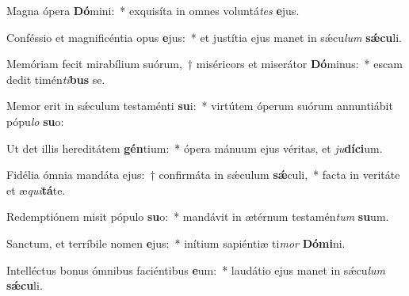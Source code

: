 \item Magna ópera \textbf{Dó}mini:~* exquisíta in omnes voluntá\textit{tes} \textbf{e}jus.
\item Conféssio et magnificéntia opus \textbf{e}jus:~* et justítia ejus manet in sǽcu\textit{lum} \textbf{sǽ}\textbf{cu}li.
\item Memóriam fecit mirabílium suórum,~† miséricors et miserátor \textbf{Dó}minus:~* escam dedit timén\textit{ti}\textbf{bus} se.
\item Memor erit in sǽculum testaménti \textbf{su}i:~* virtútem óperum suórum annuntiábit pópu\textit{lo} \textbf{su}o:
\item Ut det illis hereditátem \textbf{gén}tium:~* ópera mánuum ejus véritas, et \textit{ju}\textbf{dí}\textbf{ci}um.
\item Fidélia ómnia mandáta ejus:~† confirmáta in sǽculum \textbf{sǽ}culi,~* facta in veritáte et æ\textit{qui}\textbf{tá}te.
\item Redemptiónem misit pópulo \textbf{su}o:~* mandávit in ætérnum testamén\textit{tum} \textbf{su}um.
\item Sanctum, et terríbile nomen \textbf{e}jus:~* inítium sapiéntiæ ti\textit{mor} \textbf{Dó}\textbf{mi}ni.
\item Intelléctus bonus ómnibus faciéntibus \textbf{e}um:~* laudátio ejus manet in sǽcu\textit{lum} \textbf{sǽ}\textbf{cu}li.
